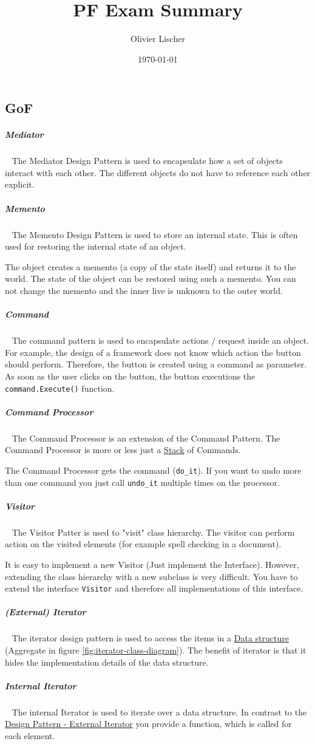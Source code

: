 \documentclass[8pt,twoside,landscape]{extarticle}
\author{Olivier Lischer}
\date{\today}
\title{PF Exam Summary}
\begin{document}
\begin{multicols}{4}

\section{GoF}
\label{sec:org650ee28}
\subparagraph{Mediator} \
\label{sec:org7291e76}
The Mediator Design Pattern is used to encapsulate how a set of objects interact with each other.
The different objects do not have to reference each other explicit.
\subparagraph{Memento} \
\label{sec:orgf631f84}
The Memento Design Pattern is used to store an internal state.
This is often used for restoring the internal state of an object.

The object creates a memento (a copy of the state itself) and returns it to the world.
The state of the object can be restored using such a memento.
You can not change the memento and the inner live is unknown to the outer world.
\subparagraph{Command} \
\label{sec:orga832c78}
The command pattern is used to encapsulate actions / request inside an object.
For example, the design of a framework does not know which action the button should perform.
Therefore, the button is created using a command as parameter.
As soon as the user clicks on the button, the button executions the \texttt{command.Execute()} function.
\subparagraph{Command Processor} \
\label{sec:org81cb79e}
The Command Processor is an extension of the Command Pattern.
The Command Processor is more or less just a \href{../../../roam/20210806220134-stack.org}{Stack} of Commands.

The Command Processor gets the command (\texttt{do\_it}).
If you want to undo more than one command you just call \texttt{undo\_it} multiple times on the processor.
\subparagraph{Visitor} \
\label{sec:orgac2eb30}
The Visitor Patter is used to "visit" class hierarchy.
The visitor can perform action on the visited elements (for example spell checking in a document).

It is easy to implement a new Visitor (Just implement the Interface).
However, extending the class hierarchy with a new subclass is very difficult.
You have to extend the interface \texttt{Visitor} and therefore all implementations of this interface.
\subparagraph{(External) Iterator} \
\label{sec:orgb865d47}
The iterator design pattern is used to access the items in a \href{../../../roam/20210518131131-datastructure.org}{Data structure} (Aggregate in figure \ref{fig:iterator-class-diagram}).
The benefit of iterator is that it hides the implementation details of the data structure.
\subparagraph{Internal Iterator} \
\label{sec:org74a2619}
The internal Iterator is used to iterate over a data structure.
In contrast to the \href{../../../roam/20220413201100-design_pattern_iterator.org}{Design Pattern - External Iterator} you provide a function, which is called for each element.


\end{multicols}
\end{document}

